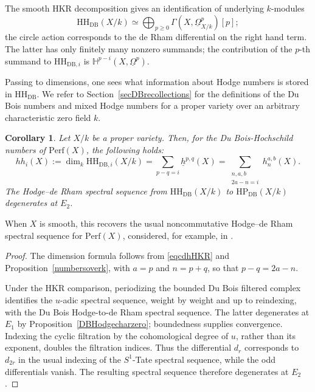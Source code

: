 \documentclass{amsart}
\theoremstyle{plain}
\newtheorem{corollary}[prop]{Corollary}
\theoremstyle{definition}
\newcommand{\Perf}{\mathrm{Perf}}
\newcommand{\HH}{\mathrm{HH}}
\newcommand{\HP}{\mathrm{HP}}
\newcommand{\DB}{\mathrm{DB}}
\begin{document}
The smooth HKR decomposition gives an identification of underlying $k$-modules
\begin{equation}\label{eqcdhHKR}
\HH_{\DB}(X/k)\simeq
 \bigoplus_{p\geq0}\Gamma(X,\underline\Omega^p_{X/k})[p];
\end{equation}
the circle action corresponds to the de Rham differential on the right hand term. The latter has only finitely many nonzero summands; the contribution of the $p$-th summand to $\HH_{\DB, i}$ is
$\mathbb H^{p-i}(X,\underline\Omega^p)$.

Passing to dimensions, one sees what information about Hodge numbers is stored in $\HH_{\DB}$. We refer to Section~\ref{secDBrecollections} for the definitions of the Du Bois numbers and mixed Hodge numbers for a proper variety over an arbitrary characteristic zero field $k$. 

\begin{corollary}\label{DBHodgeformula}
Let $X/k$ be a proper variety. Then, for the Du Bois-Hochschild numbers of $\Perf(X)$, the following holds:
\begin{equation}\label{eqcolumnHodgesum}
hh_i(X):=\dim_k \HH_{\DB,i}(X/k)
 =\sum_{p-q=i}\underline h^{p,q}(X)
 =\sum_{\substack{n,a,b\\2a-n=i}}h_n^{a,b}(X).
\end{equation}
The Hodge--de Rham spectral sequence from $\HH_{\DB}(X/k)$
to $\HP_{\DB}(X/k)$ degenerates at $E_2$.
\end{corollary}

When $X$ is smooth, this recovers the usual noncommutative Hodge--de Rham spectral sequence for $\Perf(X)$, considered, for example, in \cite{Kal17}.

\begin{proof}
The dimension formula follows from \eqref{eqcdhHKR} and Proposition~\ref{numbersoverk}, with $a=p$ and $n=p+q$, so that $p-q=2a-n$.

Under the HKR comparison, periodizing the bounded Du Bois filtered complex identifies the $u$-adic spectral sequence, weight by weight and up to reindexing, with the Du Bois Hodge-to-de Rham spectral sequence.
The latter degenerates at $E_1$ by Proposition~\ref{DBHodgecharzero}; boundedness supplies convergence. Indexing the cyclic filtration by the cohomological degree of $u$, rather than its exponent, doubles the filtration indices. Thus the differential $d_r$ corresponds to
$d_{2r}$ in the usual indexing of the $S^1$-Tate spectral sequence, while the odd differentials vanish. The resulting spectral sequence therefore degenerates at $E_2$.

\end{proof}
\end{document}
